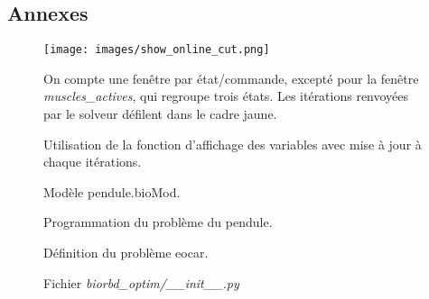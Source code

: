 \begin{appendix}
    \chapter{Annexes}
    
\newpage
\begin{figure}[H]
\begin{center}
\texttt{[image: images/show\_online\_cut.png]}
\caption{Utilisation de la fonction d'affichage des variables avec mise à jour à chaque itérations.}
On compte une fenêtre par état/commande, excepté pour la fenêtre \emph{muscles\_actives}, qui regroupe trois états. Les itérations renvoyées par le solveur défilent dans le cadre jaune.
\label{fig:show_online_violon}
\end{center}
\end{figure} 



\newpage
    
    
\label{code_pendule_bioMod}
\begin{center}

\vspace{-0.6cm}
\begin{figure}[ht]
\caption{Modèle pendule.bioMod.}
\end{figure}
\end{center}
\newpage

\label{code_pendule_python}
\begin{center}

\vspace{-0.6cm}
\begin{figure}[h]
\caption{Programmation du problème du pendule.}
\end{figure}
\end{center}
\newpage

\begin{center}
\label{eocar}

\vspace{-0.6cm}
\begin{figure}[h]
\caption{Définition du problème eocar.}
\end{figure}
\end{center}
\newpage

\begin{center}
\label{init}

\vspace{-0.6cm}
\begin{figure}[h]
\caption{Fichier \emph{biorbd\_optim/\_\_init\_\_.py}}
\end{figure}
\end{center}


\end{appendix}
